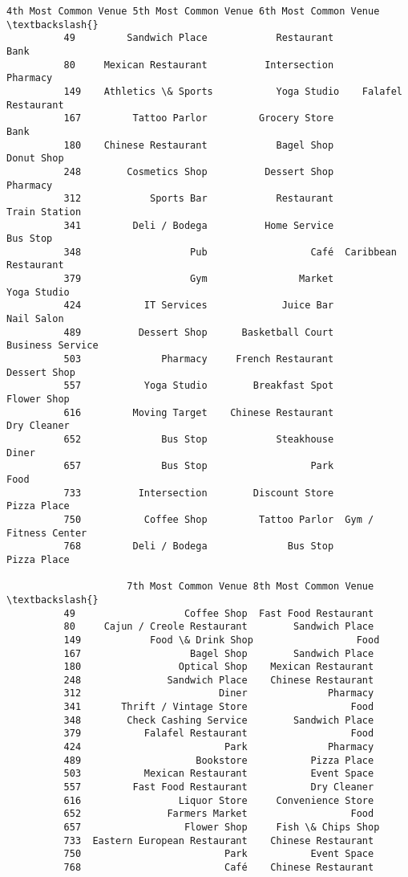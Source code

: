\documentclass[11pt]{article}
\begin{document}
\begin{Verbatim}[commandchars=\\\{\}]
              4th Most Common Venue 5th Most Common Venue 6th Most Common Venue  \textbackslash{}
          49         Sandwich Place            Restaurant                  Bank   
          80     Mexican Restaurant          Intersection              Pharmacy   
          149    Athletics \& Sports           Yoga Studio    Falafel Restaurant   
          167         Tattoo Parlor         Grocery Store                  Bank   
          180    Chinese Restaurant            Bagel Shop            Donut Shop   
          248        Cosmetics Shop          Dessert Shop              Pharmacy   
          312            Sports Bar            Restaurant         Train Station   
          341         Deli / Bodega          Home Service              Bus Stop   
          348                   Pub                  Café  Caribbean Restaurant   
          379                   Gym                Market           Yoga Studio   
          424           IT Services             Juice Bar            Nail Salon   
          489          Dessert Shop      Basketball Court      Business Service   
          503              Pharmacy     French Restaurant          Dessert Shop   
          557           Yoga Studio        Breakfast Spot           Flower Shop   
          616         Moving Target    Chinese Restaurant           Dry Cleaner   
          652              Bus Stop            Steakhouse                 Diner   
          657              Bus Stop                  Park                  Food   
          733          Intersection        Discount Store           Pizza Place   
          750           Coffee Shop         Tattoo Parlor  Gym / Fitness Center   
          768         Deli / Bodega              Bus Stop           Pizza Place   
          
                     7th Most Common Venue 8th Most Common Venue  \textbackslash{}
          49                   Coffee Shop  Fast Food Restaurant   
          80     Cajun / Creole Restaurant        Sandwich Place   
          149            Food \& Drink Shop                  Food   
          167                   Bagel Shop        Sandwich Place   
          180                 Optical Shop    Mexican Restaurant   
          248               Sandwich Place    Chinese Restaurant   
          312                        Diner              Pharmacy   
          341       Thrift / Vintage Store                  Food   
          348        Check Cashing Service        Sandwich Place   
          379           Falafel Restaurant                  Food   
          424                         Park              Pharmacy   
          489                    Bookstore           Pizza Place   
          503           Mexican Restaurant           Event Space   
          557         Fast Food Restaurant           Dry Cleaner   
          616                 Liquor Store     Convenience Store   
          652               Farmers Market                  Food   
          657                  Flower Shop     Fish \& Chips Shop   
          733  Eastern European Restaurant    Chinese Restaurant   
          750                         Park           Event Space   
          768                         Café    Chinese Restaurant   
          

\end{Verbatim}
\end{document}
